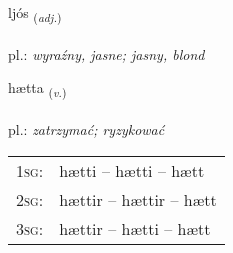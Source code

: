 \documentclass[frontgrid, backgrid]{flacards}\usepackage[]{graphicx}\usepackage[]{xcolor}
\begin{document}
\renewcommand{\blhead}{\vskip5pt {\small\bfseries\footnotesize Lýsingarorð | przymiotnik }}
\renewcommand{\bcfoot}{\vskip5pt \hspace{2pt}{\small\bfseries\footnotesize 1K}}


{ljós \small{\textsubscript{(\textit{adj.})}} \\[1ex] %
\textphonetic{[ljouːs]} \\
pl.: \emph{wyraźny, jasne; jasny, blond} \\  [2ex]
\renewcommand*{\arraystretch}{0.8}
}

\renewcommand{\flhead}{\vskip5pt \fboxsep=0pt {\small\bfseries\footnotesize Sagnorð | czasownik}}
\renewcommand{\fcfoot}{\vskip5pt \fboxsep=0pt \hspace{2pt}{\small\bfseries\footnotesize 1K}}

\renewcommand{\blhead}{\vskip5pt {\small\bfseries\footnotesize Sagnorð | czasownik }}
\renewcommand{\bcfoot}{\vskip5pt \hspace{2pt}{\small\bfseries\footnotesize 1K}}


{hætta \small{\textsubscript{(\textit{v.})}} \\[1ex] %
\textphonetic{[haihta]} \\
pl.: \emph{zatrzymać; ryzykować} \\  [2ex]
\renewcommand*{\arraystretch}{0.8}
\begin{tabular}{p{1cm}l}
\textsc{1sg}: & hætti -- hætti -- hætt \\ 
\textsc{2sg}: & hættir -- hættir -- hætt \\ 
\textsc{3sg}: & hættir -- hætti -- hætt \\ 
\end{tabular}
}
\end{document}
